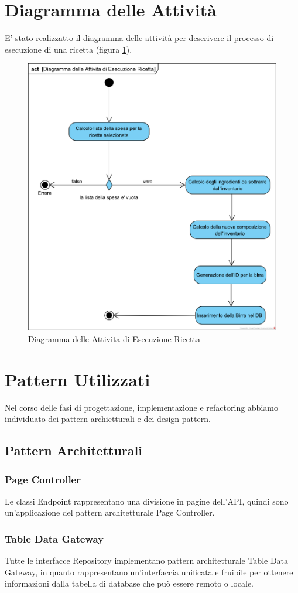 \documentclass[a4paper,12pt]{report}
\begin{document}
         \section{Diagramma delle Attività }
         E' stato realizzatto il diagramma delle attività per descrivere il processo di esecuzione di una ricetta (figura \ref{fig:attivita-esegui-ricetta}).
		\begin{figure}[!h]
			\centering
			\includegraphics[width=0.6\linewidth]{image/Diagramma-delle-Attivita-di-Esecuzione-Ricetta.png}
			\caption{Diagramma delle Attivita di Esecuzione Ricetta}\label{fig:attivita-esegui-ricetta}
		\end{figure}    
\newpage	
      	\section{Pattern Utilizzati}		
	Nel corso delle fasi di progettazione, implementazione e refactoring abbiamo individuato dei pattern archietturali e dei design pattern. 
	      	\subsection{Pattern Architetturali}
		
			\subsubsection{Page Controller}
			Le classi Endpoint rappresentano una divisione in pagine dell'API, quindi sono un'applicazione del pattern architetturale Page Controller.	
			
			\subsubsection{Table Data Gateway}
Tutte le interfacce Repository implementano pattern architetturale Table Data Gateway, in quanto rappresentano un'interfaccia unificata e fruibile per ottenere informazioni dalla tabella di database che può essere remoto o locale.	
      		
\end{document}
